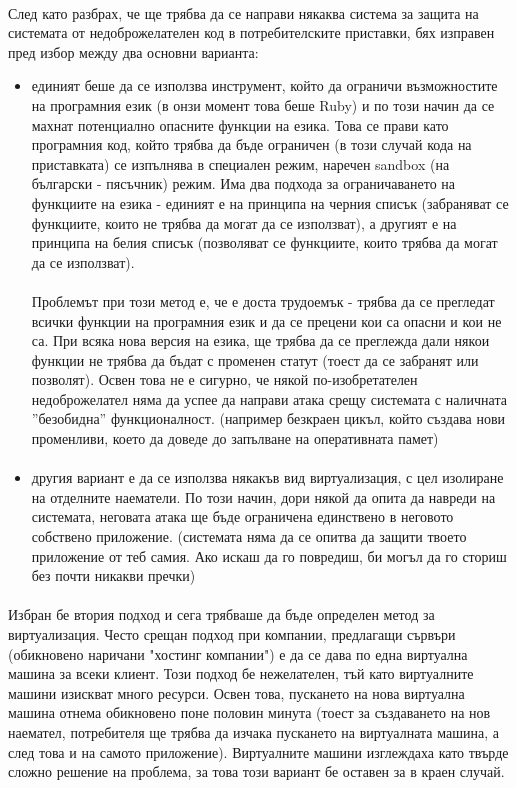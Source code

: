 \documentclass[pdftex,14pt,a4paper]{extreport}
\begin{document}
\paragraph {}
След като разбрах, че ще трябва да се направи някаква система за защита на системата от недоброжелателен код в потребителските приставки, бях изправен пред избор между два основни варианта:
\begin{itemize}
  \item
    единият беше да се използва инструмент, който да ограничи възможностите на програмния език (в онзи момент това беше Ruby) и по този начин да се махнат потенциално опасните функции на езика. Това се прави като програмния код, който трябва да бъде ограничен (в този случай кода на приставката) се изпълнява в специален режим, наречен sandbox (на български - пясъчник) режим. Има два подхода за ограничаването на функциите на езика - единият е на принципа на черния списък (забраняват се функциите, които не трябва да могат да се използват), а другият е на принципа на белия списък (позволяват се функциите, които трябва да могат да се използват).
    \paragraph {}
    Проблемът при този метод е, че е доста трудоемък - трябва да се прегледат всички функции на програмния език и да се прецени кои са опасни и кои не са. При всяка нова версия на езика, ще трябва да се преглежда дали някои функции не трябва да бъдат с променен статут (тоест да се забранят или позволят). Освен това не е сигурно, че някой по-изобретателен недоброжелател няма да успее да направи атака срещу системата с наличната ''безобидна'' функционалност. (например безкраен цикъл, който създава нови променливи, което да доведе до запълване на оперативната памет)
  \item
    \paragraph {}
    другия вариант е да се използва някакъв вид виртуализация, с цел изолиране на отделните наематели. По този начин, дори някой да опита да навреди на системата, неговата атака ще бъде ограничена единствено в неговото собствено приложение. (системата няма да се опитва да защити твоето приложение от теб самия. Ако искаш да го повредиш, би могъл да го сториш без почти никакви пречки)
\end{itemize}
\paragraph {}
Избран бе втория подход и сега трябваше да бъде определен метод за виртуализация. Често срещан подход при компании, предлагащи сървъри (обикновено наричани "хостинг компании") е да се дава по една виртуална машина за всеки клиент. Този подход бе нежелателен, тъй като виртуалните машини изискват много ресурси. Освен това, пускането на нова виртуална машина отнема обикновено поне половин минута (тоест за създаването на нов наемател, потребителя ще трябва да изчака пускането на виртуалната машина, а след това и на самото приложение). Виртуалните машини изглеждаха като твърде сложно решение на проблема, за това този вариант бе оставен за в краен случай.
\end{document}
